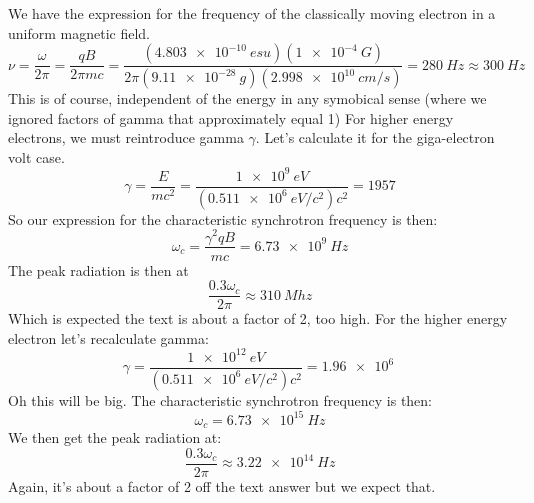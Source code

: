 We have the expression for the frequency of the classically moving electron in a uniform magnetic field.
\begin{equation}
    \nu = \frac{\omega}{2\pi} = \frac{qB}{2\pi mc} = \frac{(\qty{4.803e-10}{esu})(\qty{1e-4}{G})}{2\pi(\qty{9.11e-28}{g})(\qty{2.998e10}{cm/s})} = \qty{280}{Hz} \approx \qty{300}{Hz}
\end{equation}
This is of course, independent of the energy in any symobical sense (where we ignored factors of gamma that approximately equal 1)
For higher energy electrons, we must reintroduce gamma $\gamma$. Let's calculate it for the giga-electron volt case.
\begin{equation}
    \gamma = \frac{E}{mc^2} = \frac{\qty{1e9}{eV}}{(\qty{0.511e6}{eV/c^2})c^2} = 1957
\end{equation}
So our expression for the characteristic synchrotron frequency is then:
\begin{equation}
    \omega_c = \frac{\gamma^2qB}{mc} = \qty{6.73e9}{Hz}
\end{equation}
The peak radiation is then at
\begin{equation}
    \frac{0.3\omega_c}{2\pi} \approx \qty{310}{Mhz} 
\end{equation}
Which is expected the text is about a factor of 2, too high. For the higher energy electron let's recalculate gamma:\
\begin{equation}
    \gamma = \frac{\qty{1e12}{eV}}{(\qty{0.511e6}{eV/c^2})c^2} = \qty{1.96e6}{}
\end{equation}
Oh this will be big. The characteristic synchrotron frequency is then:
\begin{equation}
    \omega_c = \qty{6.73e15}{Hz}
\end{equation}
We then get the peak radiation at:
\begin{equation}
    \frac{0.3\omega_c}{2\pi} \approx \qty{3.22e14}{Hz} 
\end{equation}
Again, it's about a factor of 2 off the text answer but we expect that.